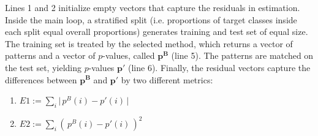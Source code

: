 \documentclass{article}
\begin{document}
Lines 1 and 2 initialize empty vectors that capture the residuals in estimation. Inside the main loop, a stratified split (i.e. proportions of target classes inside each split equal overall proportions) generates training and test set of equal size. The training set is treated by the selected method, which returns a vector of patterns and a vector of $p$-values, called $\mathbf{p^B}$ (line 5). The patterns are matched on the test set, yielding $p$-values $\mathbf{p'}$ (line 6). Finally, the residual vectors capture the differences between $\mathbf{p^B}$ and  $\mathbf{p'}$ by two different metrics:
\begin{enumerate}
  \item $E1 := \sum_i \Big|\,p^B(i) -p'(i) \,\Big|$
  \item $E2 := \sum_i \left(\, p^B(i) -p'(i) \,\right)^2$
\end{enumerate}




\end{document}
